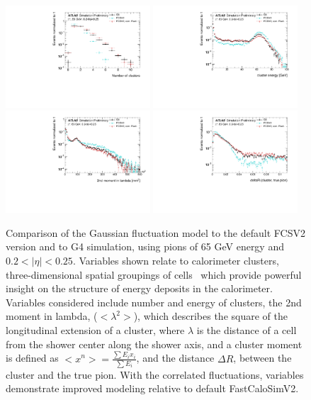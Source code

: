 \begin{figure}[ht!]
\centering
\includegraphics[width=0.48\textwidth]{figures/FCS-fig-07.pdf}
\includegraphics[width=0.48\textwidth]{figures/FCS-fig-08.pdf}
\includegraphics[width=0.48\textwidth]{figures/FCS-fig-10.pdf}
\includegraphics[width=0.48\textwidth]{figures/FCS-fig-11.pdf}
\caption{Comparison of the Gaussian fluctuation model to the default FCSV2 version and to G4 simulation, using pions of 65 GeV 
energy and $0.2 < |\eta| < 0.25$. Variables shown relate to calorimeter clusters, three-dimensional spatial groupings 
of cells~\cite{TopoCluster} which provide powerful insight on the structure of energy deposits in the calorimeter. 
Variables considered include number and energy of clusters, the 2nd moment in lambda, ($<\lambda^2>$), which 
describes the square of the longitudinal extension of a cluster, where $\lambda$ is the distance of a cell from the 
shower center along the shower axis, and a cluster moment is defined as $<x^n> =\frac{\sum E_{i}x_i}{\sum E_i}$, 
and the distance $\Delta R$, between the cluster and the true pion. With the correlated fluctuations, variables demonstrate 
improved modeling relative to default FastCaloSimV2.}
\label{fig-6} 
\end{figure}


